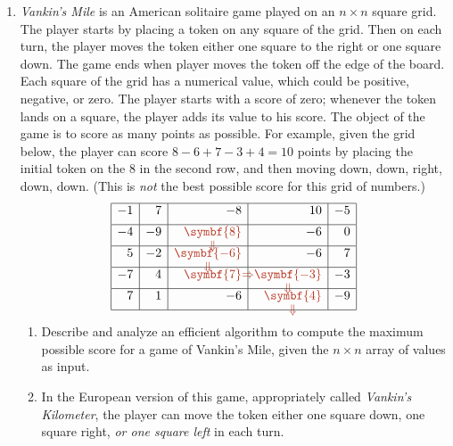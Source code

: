 \begin{enumerate}[label=\arabic*.,ref=\thechapter.\arabic*,leftmargin=*,align=left,widest*=99,itemsep=1.5ex plus 0.5ex]
For example:
\begin{itemize}
\item Given strings  and  and $\Delta =0$, your algorithm should return $9$.
\item Given strings  and  and $\Delta =1$, your algorithm should return $15$.
\item Given strings  and  and $\Delta =2$, your algorithm should return $18$.
\end{itemize}
\item \textit{Vankin’s Mile} is an American solitaire game played on an $n\times n$ square grid.
The player starts by placing a token on any square of the grid.
Then on each turn, the player moves the token either one square to the right or one square down.
The game ends when player moves the token off the edge of the board.
Each square of the grid has a numerical value, which could be positive, negative, or zero.
The player starts with a score of zero; whenever the token lands on a square, the player adds its value to his score.
The object of the game is to score as many points as possible.
For example, given the grid below, the player can score $8-6+7-3+4=10$ points by placing the initial token on the 8 in the second row, and then moving down, down, right, down, down.
(This is \textit{not} the best possible score for this grid of numbers.)
\[
\begin{array}{|r|r|r|r|r|}
\hline
-1 & 7 & -8 & 10 & -5\\[4.7pt]
\hline
-4 & -9 & {\color{JEred}\smash{\underset{\raisebox{0pt}{$\Downarrow$}}{\symbf{8}}}} & -6 & 0\\[4.7pt]
\hline
5 & -2 & {\color{JEred}\smash{\underset{\raisebox{0pt}{$\Downarrow$}}{\symbf{-6}}}} & -6 & 7\\[4.7pt]
\hline
-7 & 4 & {\color{JEred}\symbf{7}\rlap{$\Rightarrow$}} & {\color{JEred}\smash{\underset{\raisebox{0pt}{$\Downarrow$}}{\symbf{-3}}}} & -3\\[4.7pt]
\hline
7 & 1 & -6 & {\color{JEred}\smash{\underset{\raisebox{0pt}{$\Downarrow$}}{\symbf{4}}}} & -9\\[4.7pt]
\hline
\end{array}
\]
\begin{enumerate}
\item Describe and analyze an efficient algorithm to compute the maximum possible score for a game of Vankin’s Mile, given the $n\times n$ array of values as input.
\item In the European version of this game, appropriately called \textit{Vankin’s Kilometer}, the player can move the token either one square down, one square right, \textit{or one square left} in each turn.

\end{enumerate}
\end{enumerate}

